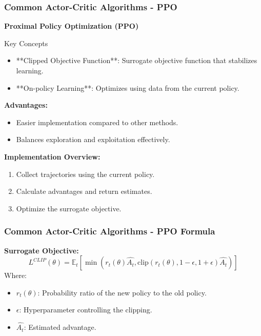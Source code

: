 \documentclass[aspectratio=169]{beamer}
\begin{document}
\begin{frame}[fragile]
    \frametitle{Common Actor-Critic Algorithms - PPO}
    \textbf{Proximal Policy Optimization (PPO)}
    \begin{block}{Key Concepts}
        \begin{itemize}
            \item **Clipped Objective Function**: Surrogate objective function that stabilizes learning.
            \item **On-policy Learning**: Optimizes using data from the current policy.
        \end{itemize}
    \end{block}
    
    \textbf{Advantages:}
    \begin{itemize}
        \item Easier implementation compared to other methods.
        \item Balances exploration and exploitation effectively.
    \end{itemize}
    
    \textbf{Implementation Overview:}
    \begin{enumerate}
        \item Collect trajectories using the current policy.
        \item Calculate advantages and return estimates.
        \item Optimize the surrogate objective.
    \end{enumerate}
\end{frame}

\begin{frame}[fragile]
    \frametitle{Common Actor-Critic Algorithms - PPO Formula}
    \textbf{Surrogate Objective:}
    \begin{equation}
        L^{CLIP}(\theta) = \mathbb{E}_t \left[ \min \left( r_t(\theta) \hat{A_t}, \text{clip}(r_t(\theta), 1 - \epsilon, 1 + \epsilon) \hat{A_t} \right) \right]
    \end{equation}
    Where:
    \begin{itemize}
        \item \( r_t(\theta) \): Probability ratio of the new policy to the old policy.
        \item \( \epsilon \): Hyperparameter controlling the clipping.
        \item \( \hat{A_t} \): Estimated advantage.
    \end{itemize}
\end{frame}
\end{document}
